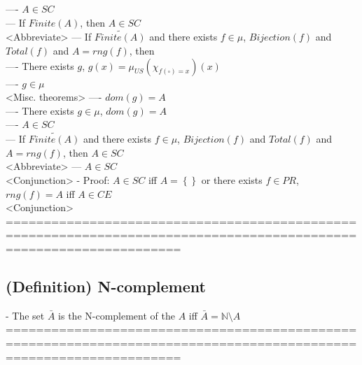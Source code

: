 \documentclass{book}
\newcommand{\pnot}[1]{\widetilde{#1}}
\newcommand{\placeholder}{\square}
\newcommand{\set}[1]{\left\{ #1 \right\}}
\begin{document}
				---- $A \in SC$ \\
			--- If $Finite(A)$, then $A \in SC$ \\ <Abbreviate>
			--- If $\pnot{Finite(A)}$ and there exists $f \in \mu$, $Bijection(f)$ and $Total(f)$ and $A = rng(f)$, then \\
				---- There exists $g$, $g(x) = \mu_{US}(\chi_{f(\placeholder) = x})(x)$ \\
				---- $g \in \mu$ \\ <Misc. theorems>
				---- $dom(g) = A$ \\
				---- There exists $g \in \mu$, $dom(g) = A$ \\
				---- $A \in SC$ \\
		 --- If $\pnot{Finite(A)}$ and there exists $f \in \mu$, $Bijection(f)$ and $Total(f)$ and $A = rng(f)$, then $A \in SC$ \\ <Abbreviate>
			--- $A \in SC$ \\ <Conjunction>
	- Proof: $A \in SC$ iff $A = \set{}$ or there exists $f \in PR$, $rng(f) = A$ iff $A \in CE$ \\ <Conjunction>
	===================================================================================================================
\subsection{(Definition) N-complement} %
	- The set $\bar{A}$ is the N-complement of the $A$ iff $\bar{A} = \mathbb{N} \setminus A$ \\
	===================================================================================================================
\end{document}
